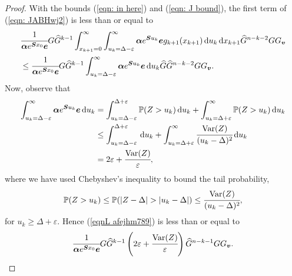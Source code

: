 \begin{proof}
		With the bounds (\ref{eqn: in here}) and (\ref{eqn: J bound}), the first term of (\ref{eqn: JABHwj2}) is less than or equal to 
		\begin{align}
			&\cfrac{1}{\boldsymbol \alpha e^{\boldsymbol{S} x_0 }\boldsymbol e}G \widehat G^{k-1}
			\int_{x_{k+1}=0}^\infty \int_{u_k=\Delta-\varepsilon}^\infty \boldsymbol \alpha e^{\boldsymbol{S}u_k}\boldsymbol e g_{k+1}(x_{k+1}) \, \mathrm{d} u_k \, \mathrm{d} x_{k+1}\widehat G^{n-k-2} G G_{\boldsymbol v}\nonumber 
			\\&\leq \cfrac{1}{\boldsymbol \alpha e^{\boldsymbol{S} x_0}\boldsymbol e}G \widehat G^{k-1}  
			\int_{u_k=\Delta-\varepsilon}^\infty \boldsymbol \alpha e^{\boldsymbol{S}u_k}\boldsymbol e \, \mathrm{d} u_k \widehat G \widehat G^{n-k-2} G G_{\boldsymbol v}. \label{eqnL afejhm789}
		\end{align}
		Now, observe that 
		\begin{align}
			\int_{u_k=\Delta-\varepsilon}^\infty \boldsymbol \alpha e^{\boldsymbol{S}u_k}\boldsymbol e \, \mathrm{d} u_k &= \int_{u_k=\Delta-\varepsilon}^{\Delta+\varepsilon} \mathbb P(Z> u_k) \, \mathrm{d} u_k + \int_{u_k=\Delta+\varepsilon}^\infty \mathbb P(Z> u_k) \, \mathrm{d} u_k\nonumber
			\\&\leq \int_{u_k=\Delta-\varepsilon}^{\Delta+\varepsilon} \, \mathrm{d} u_k + \int_{u_k=\Delta+\varepsilon}^\infty \cfrac{\mathrm{Var}(Z)}{(u_k-\Delta)^2} \, \mathrm{d} u_k\nonumber
			\\&= 2\varepsilon + \cfrac{\mathrm{Var}(Z)}{\varepsilon},\label{eqn:kdjf55}
		\end{align}
		where we have used Chebyshev's inequality to bound the tail probability, 
		\[\mathbb P(Z> u_k) \leq \mathbb P(|Z-\Delta|> |u_k-\Delta|) \leq \cfrac{\var(Z)}{(u_k-\Delta)^2},\]
		for \(u_k \geq \Delta +\varepsilon\). Hence (\ref{eqnL afejhm789}) is less than or equal to 
		\[\cfrac{1}{\boldsymbol \alpha e^{\boldsymbol{S} x_0}\boldsymbol e}G \widehat G^{k-1}  
			\left(2\varepsilon + \cfrac{\mathrm{Var}(Z)}{\varepsilon}\right) \widehat G^{n-k-1} G G_{\boldsymbol v}.\]
		

\end{proof}
